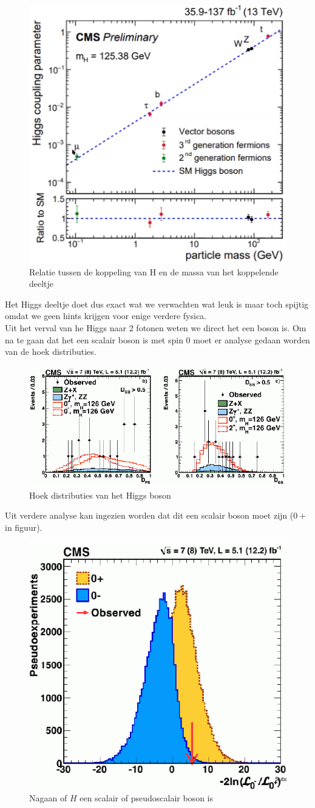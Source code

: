\documentclass[../main.tex]{subfiles}
\begin{document}
\begin{figure}[h]
    \centering
    \includegraphics[width=0.4\linewidth]{higgs_boson/h_koppeling_massa.png}
    \caption{Relatie tussen de koppeling van H en de massa van het koppelende deeltje}%
    \label{fig:higgs_boson/h_koppeling_massa}
\end{figure}

Het Higgs deeltje doet dus exact wat we verwachten wat leuk is maar toch spijtig omdat we geen hints krijgen voor enige verdere fysica.\\
Uit het verval van he Higgs naar 2 fotonen weten we direct het een boson is. Om na te gaan dat het een scalair boson is met spin 0 moet er analyse gedaan worden van de hoek distributies.

\begin{figure}[h]
    \centering
    \includegraphics[width=0.5\linewidth]{higgs_boson/h_hoek_dist.png}
    \caption{Hoek distributies van het Higgs boson}%
    \label{fig:higgs_boson/h_hoek_dist}
\end{figure}

Uit verdere analyse kan ingezien worden dat dit een scalair boson moet zijn ($0+$ in figuur).

\begin{figure}[h]
    \centering
    \includegraphics[width=0.5\linewidth]{higgs_boson/h_vec_boson.png}
    \caption{Nagaan of $H$ een scalair of pseudoscalair boson is}%
    \label{fig:higgs_boson/h_vec_boson}
\end{figure}
\end{document}

